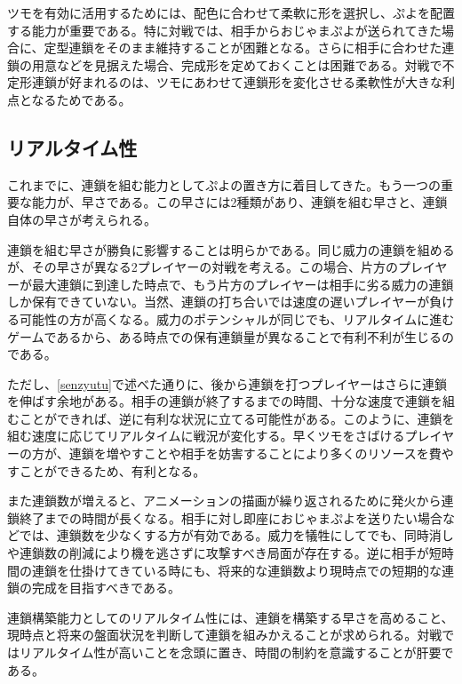 \documentclass[12pt]{jsarticle}
\begin{document}
ツモを有効に活用するためには、配色に合わせて柔軟に形を選択し、ぷよを配置する能力が重要である。特に対戦では、相手からおじゃまぷよが送られてきた場合に、定型連鎖をそのまま維持することが困難となる。さらに相手に合わせた連鎖の用意などを見据えた場合、完成形を定めておくことは困難である。対戦で不定形連鎖が好まれるのは、ツモにあわせて連鎖形を変化させる柔軟性が大きな利点となるためである。


\subsection{リアルタイム性}
これまでに、連鎖を組む能力としてぷよの置き方に着目してきた。もう一つの重要な能力が、早さである。この早さには2種類があり、連鎖を組む早さと、連鎖自体の早さが考えられる。

連鎖を組む早さが勝負に影響することは明らかである。同じ威力の連鎖を組めるが、その早さが異なる2プレイヤーの対戦を考える。この場合、片方のプレイヤーが最大連鎖に到達した時点で、もう片方のプレイヤーは相手に劣る威力の連鎖しか保有できていない。当然、連鎖の打ち合いでは速度の遅いプレイヤーが負ける可能性の方が高くなる。威力のポテンシャルが同じでも、リアルタイムに進むゲームであるから、ある時点での保有連鎖量が異なることで有利不利が生じるのである。

ただし、\ref{senzyutu}で述べた通りに、後から連鎖を打つプレイヤーはさらに連鎖を伸ばす余地がある。相手の連鎖が終了するまでの時間、十分な速度で連鎖を組むことができれば、逆に有利な状況に立てる可能性がある。このように、連鎖を組む速度に応じてリアルタイムに戦況が変化する。早くツモをさばけるプレイヤーの方が、連鎖を増やすことや相手を妨害することにより多くのリソースを費やすことができるため、有利となる。


また連鎖数が増えると、アニメーションの描画が繰り返されるために発火から連鎖終了までの時間が長くなる。相手に対し即座におじゃまぷよを送りたい場合などでは、連鎖数を少なくする方が有効である。威力を犠牲にしてでも、同時消しや連鎖数の削減により機を逃さずに攻撃すべき局面が存在する。逆に相手が短時間の連鎖を仕掛けてきている時にも、将来的な連鎖数より現時点での短期的な連鎖の完成を目指すべきである。

連鎖構築能力としてのリアルタイム性には、連鎖を構築する早さを高めること、現時点と将来の盤面状況を判断して連鎖を組みかえることが求められる。対戦ではリアルタイム性が高いことを念頭に置き、時間の制約を意識することが肝要である。
\end{document}
